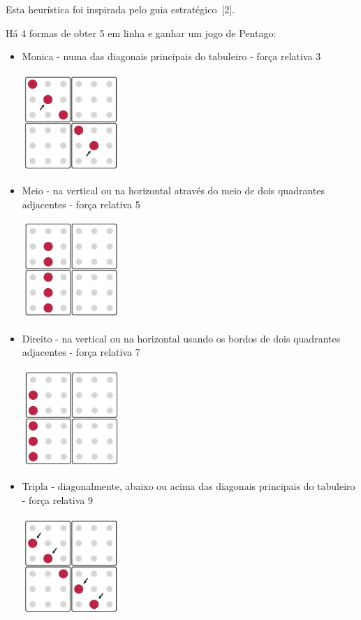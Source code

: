 
Esta heurística foi inspirada pelo guia estratégico~[2].

Há 4 formas de obter 5 em linha e ganhar um jogo de Pentago:
\begin{itemize}
	\item Monica - numa das diagonais principais do tabuleiro - força relativa 3
\begin{table}[H]
\centering
\includegraphics[height=3.7cm]{images/monica.jpg}
\end{table}
	\item Meio - na vertical ou na horizontal através do meio de dois quadrantes adjacentes - força relativa 5
\begin{table}[H]
\centering
\includegraphics[height=3.7cm]{images/middle.jpg}
\end{table}
	\item Direito - na vertical ou na horizontal usando os bordos de dois quadrantes adjacentes - força relativa 7
\begin{table}[H]
\centering
\includegraphics[height=3.7cm]{images/straight.jpg}
\end{table}
	\item Tripla - diagonalmente, abaixo ou acima das diagonais principais do tabuleiro - força relativa 9
\begin{table}[H]
\centering
\includegraphics[height=3.7cm]{images/triple.jpg}
\end{table}
\end{itemize}

